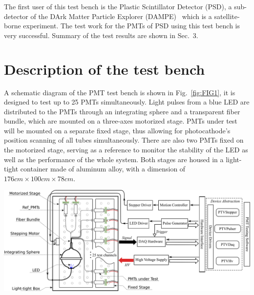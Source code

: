 \documentclass[a4paper,10pt,twoside]{cpc-hepnp}
\begin{document}
\begin{multicols}{2}
The first user of this test bench is the Plastic Scintillator Detector (PSD), a sub-detector of the DArk Matter Particle Explorer (DAMPE)~\citep{Chang_Jin_dampe} which is a satellite-borne experiment. 
The test work for the PMTs of PSD using this test bench is very successful. Summary of the test results are shown in Sec.~3.

\section{Description of the test bench}
\label{sec:description}
	
A schematic diagram of the PMT test bench is shown in Fig.~\ref{fig:FIG1}, it is designed to test up to 25 PMTs simultaneously.
Light pulses from a blue LED are distributed to the PMTs through an integrating sphere and a transparent fiber bundle, which are mounted on a three-axes motorized stage.
PMTs under test will be mounted on a separate fixed stage, thus allowing for photocathode's position scanning of all tubes simultaneously.
There are also two PMTs fixed on the motorized stage, serving as a reference to monitor the stability of the LED as well as the performance of the whole system.
Both stages are housed in a light-tight container made of aluminum alloy, with a dimension of $176cm\times100cm\times78cm$.

\end{multicols}
\begin{center}
	\includegraphics[width=140mm]{FIG1}
\end{center}
\end{document}
